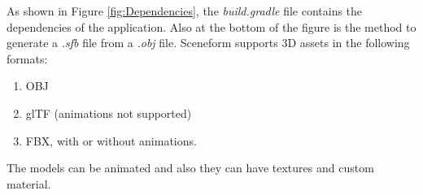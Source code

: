 As shown in Figure \ref{fig:Dependencies}, the \textit{build.gradle} file contains the dependencies of the application. Also at the bottom of the figure is the method to generate a \textit{.sfb} file from a \textit{.obj} file. Sceneform supports \ac{3D} assets in the following formats:
\begin{enumerate}
    \item OBJ
    \item glTF (animations not supported)
    \item FBX, with or without animations.
\end{enumerate}
The models can be animated and also they can have textures and custom material\cite{Sceneform}.

\begin{figure}[ht]
    \begin{minipage}{0.5\textwidth}


\end{minipage}
\end{figure}
